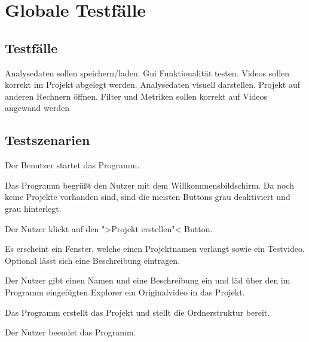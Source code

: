 \chapter{Globale Testfälle}
\section{Testfälle}
\setcounter{enumi}{0}
 Analysedaten sollen speichern/laden.
 Gui Funktionalität testen.
 Videos sollen korrekt im Projekt abgelegt werden.
 Analysedaten visuell darstellen.
 Projekt auf anderen Rechnern öffnen.
 Filter und Metriken sollen korrekt auf Videos angewand werden

\section{Testszenarien}

   \begin{compactenum}[1]
\item Der Benutzer startet das Programm.
\item Das Programm begrüßt den Nutzer mit dem Willkommensbildschirm. Da noch keine Projekte vorhanden sind, sind die meisten Buttons grau deaktiviert und grau hinterlegt.
\item Der Nutzer klickt auf den ">Projekt erstellen"< Button.
\item Es erscheint ein Fenster, welche einen Projektnamen verlangt sowie ein Testvideo. Optional lässt sich eine Beschreibung eintragen.
\item Der Nutzer gibt einen Namen und eine Beschreibung ein und läd über den im Programm eingefügten Explorer ein Originalvideo in das Projekt.
\item Das Programm erstellt das Projekt und stellt die Ordnerstruktur bereit.
\item Der Nutzer beendet das Programm.

\end{compactenum}

